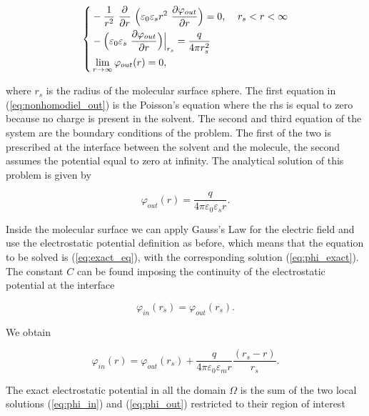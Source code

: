 \documentclass[11pt,a4paper]{article}
\begin{document}
\begin{equation}
    \left\{
    \begin{aligned}
    & - \frac{1}{r^2}\ \frac{\partial}{\partial r}\ \Big( {\varepsilon}_0 \varepsilon_s r^2\ \frac{\partial {\varphi}_{out}}{\partial r} \Big) = 0, & \mbox{\;} r_s < r < \infty \\
     & - \Big( {\varepsilon}_0 \varepsilon_s\ \frac{\partial {\varphi}_{out}}{\partial r} \Big) \Big|_{r_s} = \frac{{q}}{4 \pi r_s^2} & \\
    & \lim_{r \to \infty} {\varphi}_{out}(r) = 0, &
    \end{aligned}
    \right.
    \label{eq:nonhomodiel_out}
\end{equation}

where $r_s$ is the radius of the molecular surface sphere. The first equation in (\ref{eq:nonhomodiel_out}) is the Poisson's equation where the rhs is equal to zero because no charge is present in the solvent. The second and third equation of the system are the boundary conditions of the problem. The first of the two is prescribed at the interface between the solvent and the molecule, the second assumes the potential equal to zero at infinity. The analytical solution of this problem is given by

\begin{equation}
    {\varphi}_{out}(r) = \frac{{q}}{4 \pi {\varepsilon}_0 \varepsilon_s r}.
    \label{eq:phi_out}
\end{equation}

Inside the molecular surface we can apply Gauss's Law for the electric field and use the electrostatic potential definition as before, which means that the equation to be solved is (\ref{eq:exact_eq}), with the corresponding solution (\ref{eq:phi_exact}). The constant $C$ can be found imposing the continuity of the electrostatic potential at the interface

\begin{equation}
    {\varphi}_{in}(r_s) = {\varphi}_{out}(r_s).
    \label{eq:bc_in}
\end{equation}

We obtain 
 
 \begin{equation}
    {\varphi}_{in}(r) = {\varphi}_{out}(r_s) + \frac{{q}}{4 \pi {\varepsilon}_0 \varepsilon_m r} \frac{(r_s - r)}{r_s}.
    \label{eq:phi_in}
\end{equation}

The exact electrostatic potential in all the domain $\Omega$ is the sum of the two local solutions (\ref{eq:phi_in}) and (\ref{eq:phi_out}) restricted to their region of interest
\end{document}
